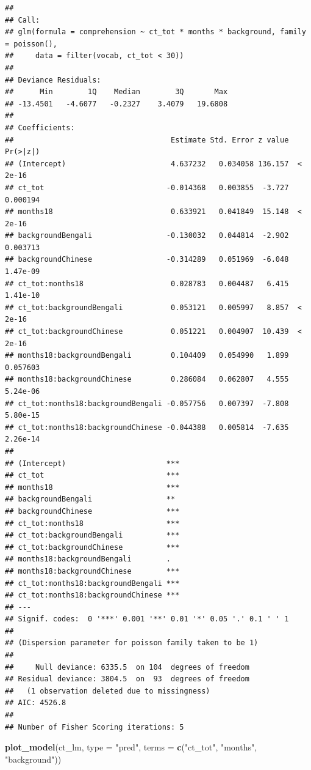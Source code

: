 \documentclass[]{article}
\newenvironment{Shaded}{\begin{snugshade}}{\end{snugshade}}
\newcommand{\DataTypeTok}[1]{\textcolor[rgb]{0.13,0.29,0.53}{#1}}
\newcommand{\KeywordTok}[1]{\textcolor[rgb]{0.13,0.29,0.53}{\textbf{#1}}}
\newcommand{\NormalTok}[1]{#1}
\newcommand{\StringTok}[1]{\textcolor[rgb]{0.31,0.60,0.02}{#1}}
\begin{document}
\begin{verbatim}
## 
## Call:
## glm(formula = comprehension ~ ct_tot * months * background, family = poisson(), 
##     data = filter(vocab, ct_tot < 30))
## 
## Deviance Residuals: 
##      Min        1Q    Median        3Q       Max  
## -13.4501   -4.6077   -0.2327    3.4079   19.6808  
## 
## Coefficients:
##                                    Estimate Std. Error z value Pr(>|z|)
## (Intercept)                        4.637232   0.034058 136.157  < 2e-16
## ct_tot                            -0.014368   0.003855  -3.727 0.000194
## months18                           0.633921   0.041849  15.148  < 2e-16
## backgroundBengali                 -0.130032   0.044814  -2.902 0.003713
## backgroundChinese                 -0.314289   0.051969  -6.048 1.47e-09
## ct_tot:months18                    0.028783   0.004487   6.415 1.41e-10
## ct_tot:backgroundBengali           0.053121   0.005997   8.857  < 2e-16
## ct_tot:backgroundChinese           0.051221   0.004907  10.439  < 2e-16
## months18:backgroundBengali         0.104409   0.054990   1.899 0.057603
## months18:backgroundChinese         0.286084   0.062807   4.555 5.24e-06
## ct_tot:months18:backgroundBengali -0.057756   0.007397  -7.808 5.80e-15
## ct_tot:months18:backgroundChinese -0.044388   0.005814  -7.635 2.26e-14
##                                      
## (Intercept)                       ***
## ct_tot                            ***
## months18                          ***
## backgroundBengali                 ** 
## backgroundChinese                 ***
## ct_tot:months18                   ***
## ct_tot:backgroundBengali          ***
## ct_tot:backgroundChinese          ***
## months18:backgroundBengali        .  
## months18:backgroundChinese        ***
## ct_tot:months18:backgroundBengali ***
## ct_tot:months18:backgroundChinese ***
## ---
## Signif. codes:  0 '***' 0.001 '**' 0.01 '*' 0.05 '.' 0.1 ' ' 1
## 
## (Dispersion parameter for poisson family taken to be 1)
## 
##     Null deviance: 6335.5  on 104  degrees of freedom
## Residual deviance: 3804.5  on  93  degrees of freedom
##   (1 observation deleted due to missingness)
## AIC: 4526.8
## 
## Number of Fisher Scoring iterations: 5
\end{verbatim}

\begin{Shaded}
\begin{Highlighting}[]
\KeywordTok{plot_model}\NormalTok{(ct_lm, }\DataTypeTok{type =} \StringTok{"pred"}\NormalTok{, }\DataTypeTok{terms =} \KeywordTok{c}\NormalTok{(}\StringTok{"ct_tot"}\NormalTok{, }\StringTok{"months"}\NormalTok{, }\StringTok{"background"}\NormalTok{))}
\end{Highlighting}
\end{Shaded}
\end{document}
